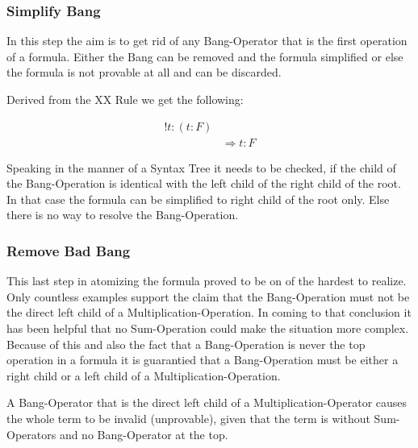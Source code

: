 

\subsubsection{Simplify Bang}
In this step the aim is to get rid of any Bang-Operator that is the first operation of a formula. Either the Bang can be removed and the formula simplified or else the formula is not provable at all and can be discarded.

Derived from the XX Rule we get the following:

\begin{equation}\label{sb}
\begin{split}
	!t:(t:F)  \\
	& \Rightarrow t: F
\end{split}
\end{equation}



Speaking in the manner of a Syntax Tree it needs to be checked, if the child of the Bang-Operation is identical with the left child of the right child of the root. In that case the formula can be simplified to right child of the root only. Else there is no way to resolve the Bang-Operation.

\subsubsection{Remove Bad Bang}
This last step in atomizing the formula proved to be on of the hardest to realize. Only countless examples support the claim that the Bang-Operation must not be the direct left child of a Multiplication-Operation. In coming to that conclusion it has been helpful that no Sum-Operation could make the situation more complex. Because of this and also the fact that a Bang-Operation is never the top operation in a formula it is guarantied that a Bang-Operation must be either a right child or a left child of a Multiplication-Operation.

\begin{assertion}
A Bang-Operator that is the direct left child of a Multiplication-Operator causes the whole term to be invalid (unprovable), given that the term is without Sum-Operators and no Bang-Operator at the top. 
\end{assertion}


